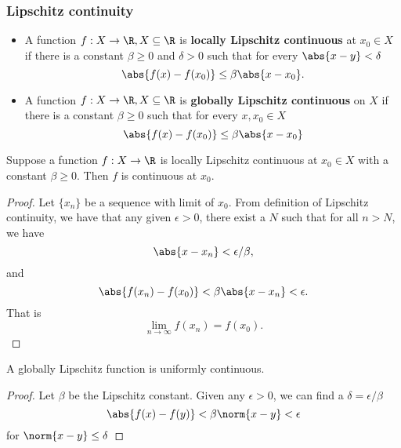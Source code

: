 \begin{refsection}
\subsubsection{Lipschitz continuity}
\begin{definition}\hfill
\begin{itemize}
	\item 	A function $f:X\rightarrow \R, X\subseteq \R$ is \textbf{locally Lipschitz continuous} at $x_0 \in X$ if there is a constant $\beta \geq 0$ and $\delta > 0$ such that for every $\abs{x-y} < \delta$
	$$\abs{f(x)-f(x_0)} \leq \beta \abs{x-x_0}.$$
	\item 
		A function $f:X\rightarrow \R, X\subseteq \R$ is \textbf{globally Lipschitz continuous} on $X$ if there is a constant $\beta \geq 0$ such that for every $x,x_0 \in X$
		$$\abs{f(x)-f(x_0)} \leq \beta \abs{x-x_0}$$
\end{itemize}	
\end{definition}

\begin{lemma}
Suppose a function $f:X\rightarrow \R$ is locally Lipschitz continuous at $x_0 \in X$ with a constant $\beta \geq 0$. Then $f$ is continuous at $x_0$.	
\end{lemma}
\begin{proof}
Let $\{x_n\}$ be a sequence with limit of $x_0$.	
From definition of Lipschitz continuity, we have that any given $\epsilon >0$, there exist a $N$ such that for all $n > N$, we have
$$\abs{x-x_n} < \epsilon/\beta,$$
and
$$ \abs{f(x_n) -f(x_0)}<\beta \abs{x-x_n} < \epsilon. $$
That is
$$\lim_{n\to \infty} f(x_n) = f(x_0).$$
\end{proof}


\begin{lemma}
	A globally Lipschitz function is uniformly continuous.
\end{lemma}
\begin{proof}
	Let $\beta$ be the Lipschitz constant. 
	Given any $\epsilon > 0$, we can find a $\delta = \epsilon/\beta$
	$$\abs{f(x)-f(y)} < \beta \norm{x-y} < \epsilon$$
	for $\norm{x-y}\leq \delta$
\end{proof}








\end{refsection}
